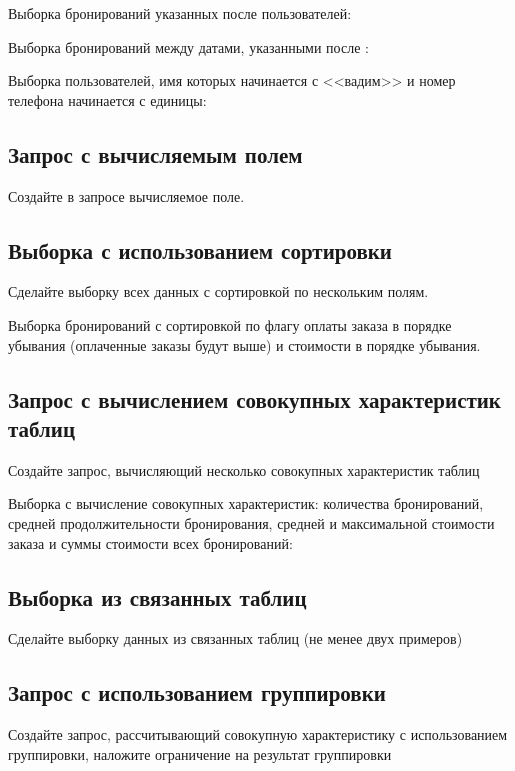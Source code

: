Выборка бронирований указанных после  пользователей:

Выборка бронирований между датами, указанными после :

Выборка пользователей, имя которых начинается с <<вадим>> и номер телефона начинается с единицы:

\subsection{Запрос с вычисляемым полем}

Создайте в запросе вычисляемое поле. 


\subsection{Выборка с использованием сортировки}

Сделайте выборку всех данных с сортировкой по нескольким полям.

Выборка бронирований с сортировкой по флагу оплаты заказа в порядке убывания (оплаченные заказы будут выше) и стоимости в порядке убывания. 

\subsection{Запрос с вычислением совокупных характеристик таблиц}

Создайте запрос, вычисляющий несколько совокупных характеристик таблиц

Выборка с вычисление совокупных характеристик: количества бронирований, средней продолжительности бронирования, средней и максимальной стоимости заказа и суммы стоимости всех бронирований:

\subsection{Выборка из связанных таблиц}

Сделайте выборку данных из связанных таблиц (не менее двух примеров)

\subsection{Запрос с использованием группировки}

Создайте запрос, рассчитывающий совокупную характеристику с использованием группировки, наложите ограничение на результат группировки

